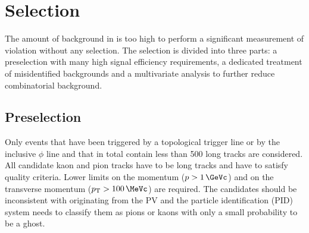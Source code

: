 
\section{Selection}
\label{sec:b02dd:selection}

The amount of background in \BdToDD is too high to perform a significant
measurement of \CP violation without any selection. The selection is divided
into three parts: a preselection with many high signal efficiency
requirements, a dedicated treatment of misidentified backgrounds and a
multivariate analysis to further reduce combinatorial background.

\subsection{Preselection}
\label{sec:b02dd:selection:cuts}

Only events that have been triggered by a topological trigger line or by the
inclusive $\phi$ line and that in total contain less than \num{500} long
tracks are considered. All candidate kaon and pion tracks have to be long
tracks and have to satisfy quality criteria. Lower limits on the momentum ($p
> \SI{1}{\GeVc}$) and on the transverse momentum ($\pT > \SI{100}{\MeVc}$) are
required. The candidates should be inconsistent with originating from the PV
and the particle identification (PID) system needs to classify them as pions
or kaons with only a small probability to be a ghost.

